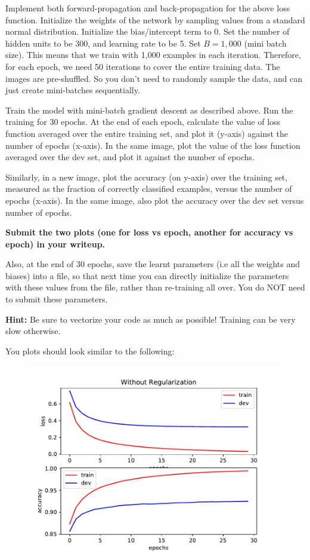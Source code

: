 \item {} 

Implement both forward-propagation and back-propagation for the above loss function.
Initialize the weights of the network by sampling values from a standard normal
distribution. Initialize the bias/intercept term to 0.
Set the number of hidden units to be 300, and learning rate to be 5. Set $B = 1,000$
(mini batch size). This means that we train with 1,000 examples in each iteration.
Therefore, for each epoch, we need 50 iterations to cover the entire training data.
The images are pre-shuffled. So you don't need to randomly sample the data, and can
just create mini-batches sequentially.


Train the model with mini-batch gradient descent
as described above. Run the training for 30 epochs. At the end of each epoch, calculate
the value of loss function averaged over the entire training set, and plot it
(y-axis) against the number of epochs (x-axis). In the same image, plot the value
of the loss function averaged over the dev set, and plot it against the number of epochs.

Similarly, in a new image, plot the accuracy (on y-axis) over the training set,
measured as the fraction of correctly classified examples, versus the number of epochs
(x-axis). In the same image, also plot the accuracy over the dev set versus number of epochs.

\textbf{Submit the two plots (one for loss vs epoch, another for accuracy vs epoch) in your writeup.}

Also, at the end of 30 epochs, save the learnt parameters (i.e all the weights and biases)
into a file, so that next time you can directly initialize the parameters with
these values from the file, rather than re-training all over. You do NOT need to
submit these parameters.


\textbf{Hint:} Be sure to vectorize your code as much as possible! Training can be
very slow otherwise.

\clearpage\newpage

You plots should look similar to the following:

\begin{figure}[H]
    \centering
    \includegraphics[scale=0.75]{mnist/src/baseline.pdf}
\end{figure}
